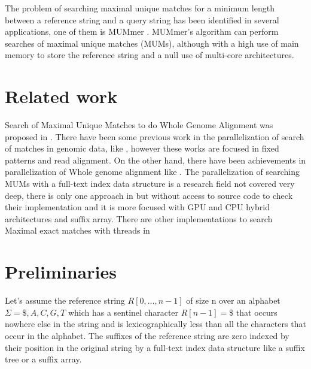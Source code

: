 \documentclass{acm_proc_article-sp}
\begin{document}
The problem of searching maximal unique matches for a minimum length between a reference string and a query string has been
identified in several applications, one of them is MUMmer \cite{Delcher2003}. MUMmer's algorithm can perform searches of maximal unique matches (MUMs), although
with a high use of main memory to store the reference string and a null use of multi-core architectures.

\section{Related work}
Search of Maximal Unique Matches to do Whole Genome Alignment was proposed in \cite{Delcher1999}. There have been some previous work in the parallelization of search of matches in genomic data, like \cite{OguzhanKulekci2011,Mongelli,Kouzinopoulos2005}, however these works are focused in fixed patterns and read alignment. On the other hand, there have been achievements in parallelization of Whole genome alignment like \cite{Meng2005}. The parallelization of searching MUMs with a full-text index data structure is a research field not covered very deep, there is only one approach in \cite{Encarnac2011} but without access to source code to check their implementation and it is more focused with GPU and CPU hybrid architectures and suffix array. There are other implementations to search Maximal exact matches with threads in \cite{Vyverman2013,OguzhanKulekci2011,Khan2009,OhlebuschGK10}

\section{Preliminaries}
Let's assume the reference string $R[0,\ldots, n − 1]$ of size n over an alphabet $\Sigma={ \$, A, C, G, T}$ which has a sentinel character $R[n − 1] = \$$ that occurs nowhere else in the string and is lexicographically less than all the characters that occur in the alphabet. The suffixes of the reference string are zero indexed by their position in the original string by a full-text index data structure like a suffix tree or a suffix array. 
\end{document}
